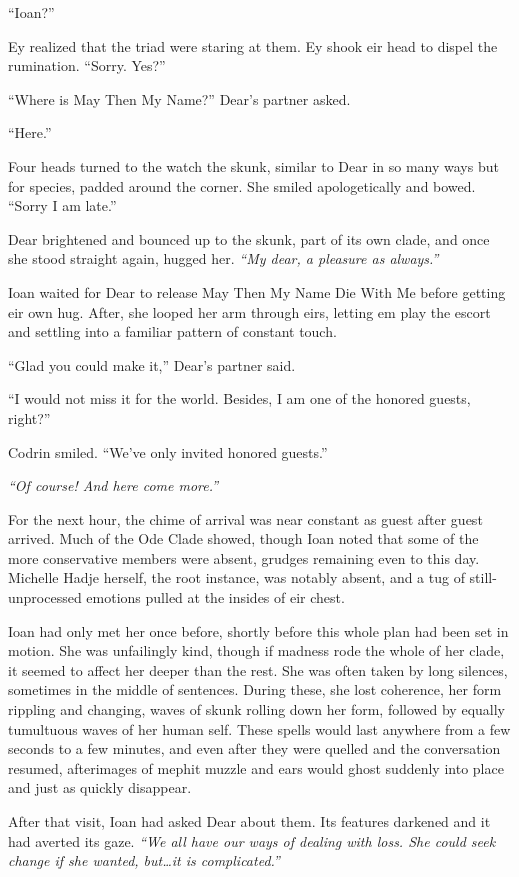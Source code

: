 ``Ioan?''

Ey realized that the triad were staring at them. Ey shook eir head to dispel the rumination. ``Sorry. Yes?''

``Where is May Then My Name?'' Dear's partner asked.

``Here.''

Four heads turned to the watch the skunk, similar to Dear in so many ways but for species, padded around the corner. She smiled apologetically and bowed. ``Sorry I am late.''

Dear brightened and bounced up to the skunk, part of its own clade, and once she stood straight again, hugged her. \emph{``My dear, a pleasure as always.''}

Ioan waited for Dear to release May Then My Name Die With Me before getting eir own hug. After, she looped her arm through eirs, letting em play the escort and settling into a familiar pattern of constant touch.

``Glad you could make it,'' Dear's partner said.

``I would not miss it for the world. Besides, I am one of the honored guests, right?''

Codrin smiled. ``We've only invited honored guests.''

\emph{``Of course! And here come more.''}

For the next hour, the chime of arrival was near constant as guest after guest arrived. Much of the Ode Clade showed, though Ioan noted that some of the more conservative members were absent, grudges remaining even to this day. Michelle Hadje herself, the root instance, was notably absent, and a tug of still-unprocessed emotions pulled at the insides of eir chest.

Ioan had only met her once before, shortly before this whole plan had been set in motion. She was unfailingly kind, though if madness rode the whole of her clade, it seemed to affect her deeper than the rest. She was often taken by long silences, sometimes in the middle of sentences. During these, she lost coherence, her form rippling and changing, waves of skunk rolling down her form, followed by equally tumultuous waves of her human self. These spells would last anywhere from a few seconds to a few minutes, and even after they were quelled and the conversation resumed, afterimages of mephit muzzle and ears would ghost suddenly into place and just as quickly disappear.

After that visit, Ioan had asked Dear about them. Its features darkened and it had averted its gaze. \emph{``We all have our ways of dealing with loss. She could seek change if she wanted, but\ldots it is complicated.''}

